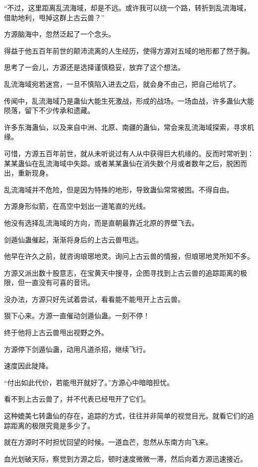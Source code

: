\begin{this_body}
“不过，这里距离乱流海域，却是不远。或许我可以绕一个路，转折到乱流海域，借助地利，甩掉这群上古云兽？”

方源脑海中，忽然泛起了一个念头。

得益于他五百年前世的颠沛流离的人生经历，使得方源对五域的地形都了然于胸。

思考了一会儿，方源还是选择谨慎稳妥，放弃了这个想法。

乱流海域宛若迷宫，一旦不慎陷入进去之后，就会身不由己，把自己给坑了。

传闻中，乱流海域乃是蛊仙大能生死激战，形成的战场。一场血战，许多蛊仙大能陨落，留下不少传承和遗藏。

许多东海蛊仙，以及来自中洲、北原、南疆的蛊仙，常会来乱流海域探索，寻求机缘。

可惜，方源五百年前世，就从未听说过有人从中获得巨大机缘的。反而时常听到：某某蛊仙在乱流海域中失踪。或者某某蛊仙在消失数个月或者数年之后，脱困而出，重新现身。

乱流海域并不危险，但是因为特殊的地形，导致蛊仙常常被困。不得自由。

方源身形似箭，在高空中划出一道笔直的光线。

他没有选择乱流海域的方向，而是直朝最靠近北原的界壁飞去。

剑遁仙蛊催起，渐渐将身后的上古云兽甩远。

他早在许久之前，就咨询琅琊地灵。询问上古云兽的情报，但琅琊地灵所知不多。

方源又派出数十股意志，在宝黄天中搜寻，企图寻找到上古云兽的追踪距离的极限，但一直没有可喜的音讯。

没办法，方源只好先试着尝试，看看能不能甩开上古云兽。

狠下心来。方源一直催动剑遁仙蛊。一刻不停！

终于他将上古云兽甩出视野之外。

方源停下剑遁仙蛊，动用凡道杀招，继续飞行。

速度因此陡降。

“付出如此代价，若能甩开就好了。”方源心中暗暗担忧。

看不到上古云兽了，并不代表已经甩开了它们。

这种媲美七转蛊仙的存在，追踪的方式，往往并非简单的视觉目光。就看它们的追踪距离的极限究竟是多少了。

就在方源时不时担忧回望的时候。一道血芒，忽然从东南方向飞来。

血光划破天际，察觉到方源之后，顿时速度微微一滞，然后向着方源迅速接近。


\end{this_body}
